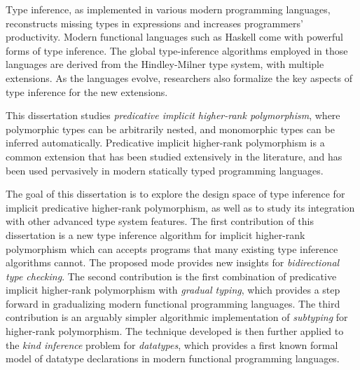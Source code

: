 %
\noindent

Type inference, as implemented in various modern programming languages,
reconstructs missing types in expressions and increases programmers'
productivity. Modern functional languages such as Haskell come with powerful
forms of type inference. The global type-inference algorithms employed in those
languages are derived from the Hindley-Milner type system, with multiple
extensions. As the languages evolve, researchers also formalize the key aspects
of type inference for the new extensions.

This dissertation studies \textit{predicative implicit higher-rank
  polymorphism}, where polymorphic types can be arbitrarily nested, and
monomorphic types can be inferred automatically. Predicative implicit
higher-rank polymorphism is a common extension that has been studied extensively
in the literature, and has been used pervasively in modern statically typed
programming languages.

The goal of this dissertation is to explore the design space of type inference
for implicit predicative higher-rank polymorphism, as well as to study its
integration with other advanced type system features. The first contribution of
this dissertation is a new type inference algorithm for implicit higher-rank
polymorphism which can accepts programs that many existing type inference
algorithms cannot. The proposed \textit{\mode} mode provides new insights for
\textit{bidirectional type checking}. The second contribution is the first
combination of predicative implicit higher-rank polymorphism with
\textit{gradual typing}, which provides a step forward in gradualizing modern
functional programming languages. The third contribution is an arguably simpler
algorithmic implementation of \textit{subtyping} for higher-rank polymorphism.
The technique developed is then further applied to the \textit{kind inference}
problem for \textit{datatypes}, which provides a first known formal model of
datatype declarations in modern functional programming languages.








